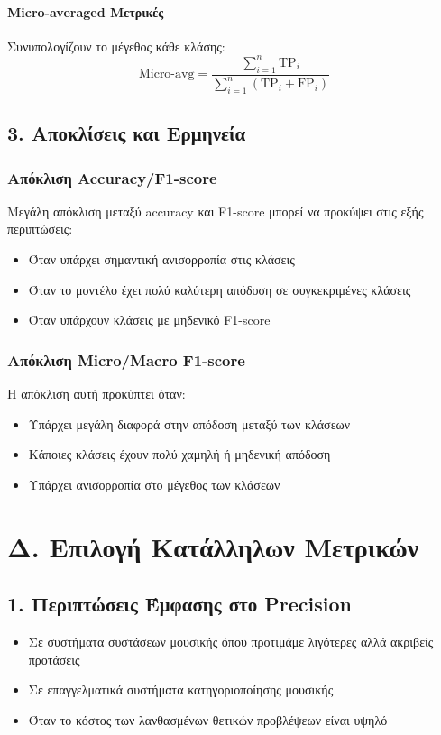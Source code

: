 \documentclass[a4paper,12pt]{article}
\begin{document}
\paragraph{Micro-averaged Μετρικές}
Συνυπολογίζουν το μέγεθος κάθε κλάσης:
\[ \text{Micro-avg} = \frac{\sum_{i=1}^{n} \text{TP}_i}{\sum_{i=1}^{n} (\text{TP}_i + \text{FP}_i)} \]

\subsection*{3. Αποκλίσεις και Ερμηνεία}

\subsubsection*{Απόκλιση Accuracy/F1-score}
Μεγάλη απόκλιση μεταξύ accuracy και F1-score μπορεί να προκύψει στις εξής περιπτώσεις:
\begin{itemize}
    \item Όταν υπάρχει σημαντική ανισορροπία στις κλάσεις
    \item Όταν το μοντέλο έχει πολύ καλύτερη απόδοση σε συγκεκριμένες κλάσεις
    \item Όταν υπάρχουν κλάσεις με μηδενικό F1-score
\end{itemize}

\subsubsection*{Απόκλιση Micro/Macro F1-score}
Η απόκλιση αυτή προκύπτει όταν:
\begin{itemize}
    \item Υπάρχει μεγάλη διαφορά στην απόδοση μεταξύ των κλάσεων
    \item Κάποιες κλάσεις έχουν πολύ χαμηλή ή μηδενική απόδοση
    \item Υπάρχει ανισορροπία στο μέγεθος των κλάσεων
\end{itemize}

\section*{Δ. Επιλογή Κατάλληλων Μετρικών}

\subsection*{1. Περιπτώσεις Έμφασης στο Precision}
\begin{itemize}
    \item Σε συστήματα συστάσεων μουσικής όπου προτιμάμε λιγότερες αλλά ακριβείς προτάσεις
    \item Σε επαγγελματικά συστήματα κατηγοριοποίησης μουσικής
    \item Όταν το κόστος των λανθασμένων θετικών προβλέψεων είναι υψηλό
\end{itemize}
\end{document}
